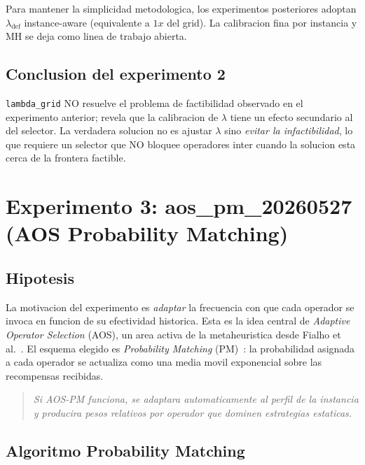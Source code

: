 Para mantener la simplicidad metodologica, los experimentos
posteriores adoptan $\lambda_{\text{def}}$ instance-aware
(equivalente a $1x$ del grid). La calibracion fina por instancia y MH
se deja como linea de trabajo abierta.

\subsection{Conclusion del experimento 2}

\texttt{lambda\_grid} NO resuelve el problema de factibilidad observado
en el experimento anterior; revela que la calibracion de $\lambda$
tiene un efecto secundario al del selector. La verdadera solucion no
es ajustar $\lambda$ sino \emph{evitar la infactibilidad}, lo que
requiere un selector que NO bloquee operadores inter cuando la solucion
esta cerca de la frontera factible.

\section{Experimento 3: aos\_pm\_20260527 (AOS Probability Matching)}
\label{sec:exp-aos}

\subsection{Hipotesis}

La motivacion del experimento es \emph{adaptar} la frecuencia con que
cada operador se invoca en funcion de su efectividad historica. Esta es
la idea central de \emph{Adaptive Operator Selection} (AOS), un area
activa de la metaheuristica desde Fialho et al.~\cite{fialho2008}. El esquema
elegido es \emph{Probability Matching} (PM)~\cite{thierens2005}: la probabilidad asignada a
cada operador se actualiza como una media movil exponencial sobre las
recompensas recibidas.

\begin{quote}
\textit{Si AOS-PM funciona, se adaptara automaticamente al perfil de la
instancia y producira pesos relativos por operador que dominen
estrategias estaticas.}
\end{quote}

\subsection{Algoritmo Probability Matching}

